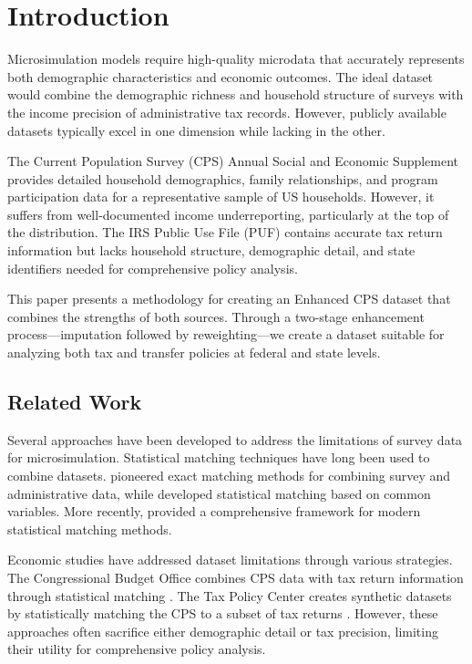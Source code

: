 \section{Introduction}

Microsimulation models require high-quality microdata that accurately represents both demographic characteristics and economic outcomes. The ideal dataset would combine the demographic richness and household structure of surveys with the income precision of administrative tax records. However, publicly available datasets typically excel in one dimension while lacking in the other.

The Current Population Survey (CPS) Annual Social and Economic Supplement provides detailed household demographics, family relationships, and program participation data for a representative sample of US households. However, it suffers from well-documented income underreporting, particularly at the top of the distribution. The IRS Public Use File (PUF) contains accurate tax return information but lacks household structure, demographic detail, and state identifiers needed for comprehensive policy analysis.

This paper presents a methodology for creating an Enhanced CPS dataset that combines the strengths of both sources. Through a two-stage enhancement process—imputation followed by reweighting—we create a dataset suitable for analyzing both tax and transfer policies at federal and state levels.

\subsection{Related Work}

Several approaches have been developed to address the limitations of survey data for microsimulation. Statistical matching techniques have long been used to combine datasets. \citep{radner1978} pioneered exact matching methods for combining survey and administrative data, while \citep{rodgers1984} developed statistical matching based on common variables. More recently, \citep{d'orazio2006} provided a comprehensive framework for modern statistical matching methods.

Economic studies have addressed dataset limitations through various strategies. The Congressional Budget Office combines CPS data with tax return information through statistical matching \citep{cbo2022}. The Tax Policy Center creates synthetic datasets by statistically matching the CPS to a subset of tax returns \citep{rohaly2005}. However, these approaches often sacrifice either demographic detail or tax precision, limiting their utility for comprehensive policy analysis.

